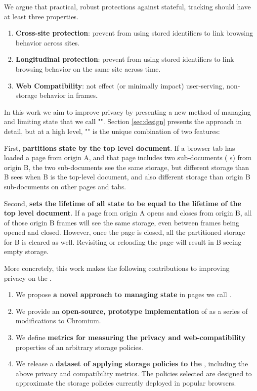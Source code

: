 We argue that practical, robust protections against stateful, \TP{} tracking
should have at least three properties.

\begin{enumerate}
  \item \textbf{Cross-site protection}: prevent \TPs{} from using
    stored identifiers to link browsing behavior across \FP{} sites.
  \item \textbf{Longitudinal protection}: prevent \TPs{} from using stored
    identifiers to link browsing behavior on the same \FP{} site across
    time.
  \item \textbf{Web Compatibility}: not effect (or minimally impact)
    user-serving, non-storage behavior in \TP{} frames.
\end{enumerate}

In this work we aim to improve \Web{} privacy by presenting a new method of
managing and limiting \TP{} state that we call "\ToolName{}".
Section \ref{sec:design} presents the approach in detail, but
at a high level, "\ToolName{}" is the unique combination of two features:

First, \textbf{\ToolName{} partitions \TP{} state by the top level document}.
If a browser tab has loaded a page from origin A,
and that page includes two sub-documents (\IE{} \IFrame{}s) from origin B,
the two sub-documents see the same storage, but different storage than B sees
when B is the top-level document, and also different storage than origin B
sub-documents on other pages and tabs.

Second, \textbf{\ToolName{} sets the lifetime of all \TPs{} state to be equal
to the lifetime of the top level document}.  If a page from origin A opens and
closes \IFrames{} from origin B, all of those origin B frames will see the same
storage, even between frames being opened and closed. However, once the page
is closed, all the partitioned storage for B is cleared as well.
Revisiting or reloading the page will result in B seeing empty storage.

More concretely, this work makes the following contributions to improving
privacy on the \Web{}.

\begin{enumerate}
  \item We propose \textbf{a novel approach to managing \TP{} state} in
    \Web{} pages we call \ToolName{}.
  \item We provide an \textbf{open-source, prototype implementation} of
    \ToolName{} as a series of modifications to Chromium.
  \item We define \textbf{metrics for measuring the privacy and
    web-compatibility} properties of an arbitrary \TP{} storage policies.
  \item We release a \textbf{dataset of applying \NumStoragePolicies{} storage
    policies to the \WebDataSet{}}, including the above privacy and
    compatibility metrics.  The \NumStoragePolicies{} policies selected are
    designed to approximate the \TP{} storage policies currently deployed
    in popular browsers.
\end{enumerate}